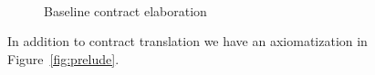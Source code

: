 \documentclass[preprint,nocopyrightspace]{sigplanconf}
\begin{document}
\begin{figure}
\[\begin{array}{c}
\end{array}\]
\caption{Baseline contract elaboration}\label{fig:typing}
\end{figure}


In addition to contract translation we have an axiomatization in Figure~\ref{fig:prelude}.
\end{document}
